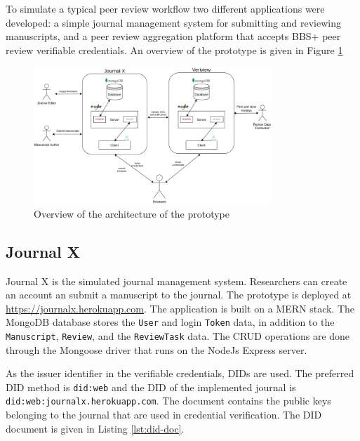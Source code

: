 To simulate a typical peer review workflow two different applications were developed: a simple journal management system for submitting and reviewing manuscripts, and a peer review aggregation platform that accepts BBS+ peer review verifiable credentials. An overview of the prototype is given in Figure \ref{fig:prototype}

\begin{figure}[htpb]
  \centering
  \includegraphics[width=0.8\textwidth]{figures/prototype.png}
  \caption{Overview of the architecture of the prototype} \label{fig:prototype}
\end{figure}

\subsection{Journal X}

Journal X is the simulated journal management system. Researchers can create an account an submit a manuscript to the journal. The prototype is deployed at \url{https://journalx.herokuapp.com}. The application is built on a \acrshort{MERN} stack. The MongoDB database stores the \lstinline{User} and login \lstinline{Token} data, in addition to the \lstinline{Manuscript}, \lstinline{Review}, and the \lstinline{ReviewTask} data. The \acrshort{CRUD} operations are done through the Mongoose driver that runs on the NodeJs Express server.

As the issuer identifier in the verifiable credentials, \acrshort{DID}s are used. The preferred \acrshort{DID} method is \lstinline{did:web} and the \acrshort{DID} of the implemented journal is \lstinline{did:web:journalx.herokuapp.com}. The document contains the public keys belonging to the journal that are used in credential verification. The \acrshort{DID} document is given in Listing \ref{lst:did-doc}.



